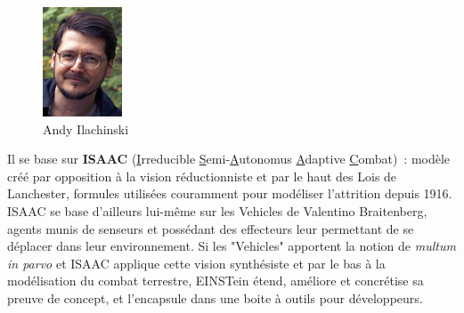 \documentclass{article}
\begin{document}
\begin{center}
\begin{figure}[H]
\begin{minipage}[H]{0.25\linewidth}
	\includegraphics[width=\textwidth]{../ressources/ilachinski}
	\caption{Andy Ilachinski}
\end{minipage}
\end{figure}
\end{center}

Il se base sur \textbf{ISAAC} (\underline{I}rreducible \underline{S}emi-\underline{A}utonomus \underline{A}daptive \underline{C}ombat)~: modèle créé par opposition à la vision réductionniste et par le haut des Lois de Lanchester, formules utilisées couramment pour modéliser l'attrition depuis 1916. ISAAC se base d'ailleurs lui-même sur les \og{}Vehicles\fg{} de Valentino Braitenberg, agents munis de senseurs et possédant des effecteurs leur permettant de se déplacer dans leur environnement. Si les "Vehicles" apportent la notion de \emph{multum in parvo} et ISAAC applique cette vision synthésiste et par le bas à la modélisation du combat terrestre, EINSTein étend, améliore et concrétise sa preuve de concept, et l'encapsule dans une boite à outils pour développeurs.
\end{document}
